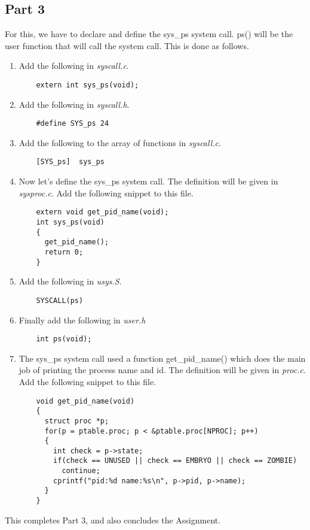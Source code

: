 \documentclass[a4paper]{article}
\begin{document}
\subsection*{Part 3}
For this, we have to declare and define the sys\_ps system call. ps() will be the user function that will call the system call. This is done as follows.
\begin{enumerate}
	\item Add the following in \textit{syscall.c}.
    \begin{lstlisting}
    extern int sys_ps(void);
    \end{lstlisting}
    \item Add the following in \textit{syscall.h}.
    \begin{lstlisting}
    #define SYS_ps 24
    \end{lstlisting}
    \item Add the following to the array of functions in \textit{syscall.c}.
    \begin{lstlisting}
    [SYS_ps]  sys_ps
    \end{lstlisting}
    \item Now let's define the sys\_ps system call. The definition will be given in \textit{sysproc.c}. Add the following snippet to this file.
    \newpage
    \begin{lstlisting}
    extern void get_pid_name(void);
    int sys_ps(void)
    {
      get_pid_name();
      return 0;
    }
    \end{lstlisting}
    \item Add the following in \textit{usys.S}.
    \begin{lstlisting}
    SYSCALL(ps)
    \end{lstlisting}
    \item Finally add the following in \textit{user.h}
    \begin{lstlisting}
    int ps(void);
    \end{lstlisting}
    \item The sys\_ps system call used a function get\_pid\_name() which does the main job of printing the process name and id. The definition will be given in \textit{proc.c}. Add the following snippet to this file.
    \begin{lstlisting}
    void get_pid_name(void)
    {
      struct proc *p;
      for(p = ptable.proc; p < &ptable.proc[NPROC]; p++)
      {
        int check = p->state;
        if(check == UNUSED || check == EMBRYO || check == ZOMBIE)
          continue;
        cprintf("pid:%d name:%s\n", p->pid, p->name);
      }
    }
    \end{lstlisting}
\end{enumerate}

This completes Part 3, and also concludes the Assignment.
\end{document}

